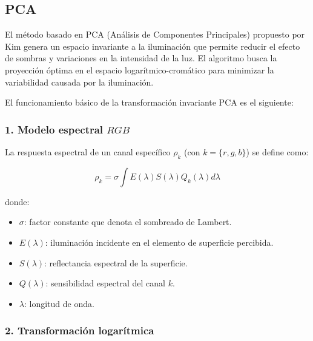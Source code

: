 \subsection{PCA}\label{pca}
El método basado en PCA (Análisis de Componentes Principales) \cite{pca2017} propuesto por Kim genera un espacio invariante a la iluminación que permite reducir el efecto de sombras y variaciones en la intensidad de la luz. El algoritmo busca la proyección óptima en el espacio logarítmico-cromático para minimizar la variabilidad causada por la iluminación.

El funcionamiento básico de la transformación invariante PCA es el siguiente:

\subsubsection{1. Modelo espectral $RGB$}

La respuesta espectral de un canal específico $\rho_k$ (con $k=\{r,g,b\}$) se define como:

$$\rho_k =\sigma \int E(\lambda )S(\lambda )Q_k (\lambda )d\lambda$$

donde:

\begin{itemize}
\setlength{\itemsep}{-1ex}
   \item{\begin{flushleft} $\sigma$: factor constante que denota el sombreado de Lambert. \end{flushleft}}
   \item{\begin{flushleft} $E(\lambda )$: iluminación incidente en el elemento de superficie percibida. \end{flushleft}}
   \item{\begin{flushleft} $S(\lambda )$: reflectancia espectral de la superficie. \end{flushleft}}
   \item{\begin{flushleft} $Q(\lambda )$: sensibilidad espectral del canal $k$. \end{flushleft}}
   \item{\begin{flushleft} $\lambda$: longitud de onda. \end{flushleft}}
\end{itemize}

\subsubsection{2. Transformación logarítmica}

